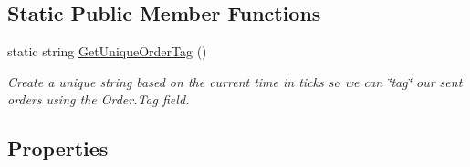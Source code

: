 \subsection*{Static Public Member Functions}
\begin{DoxyCompactItemize}
\item 
static string \hyperlink{class_e_z_a_p_i_1_1_containers_1_1_t_t_order_ac1d82bc6f472a2ce3d93cf0f699c3db5}{Get\-Unique\-Order\-Tag} ()
\begin{DoxyCompactList}\small\item\em Create a unique string based on the current time in ticks so we can \char`\"{}tag\char`\"{} our sent orders using the Order.\-Tag field. \end{DoxyCompactList}\end{DoxyCompactItemize}
\subsection*{Properties}
